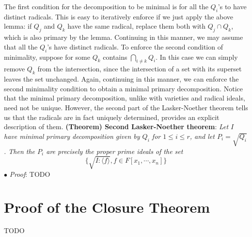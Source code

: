 \documentclass{article}
\newcommand*{\tb}{\textbf}
\newcommand*{\ti}{\textit}
\newcommand*{\nn}{\newline \newline}
\newcommand*{\Pf}{\indent \ensuremath{\bullet} \textit{Proof}: }
\newcommand*{\Fx}{\ensuremath{F[x_1, \cdots, x_n]}}
\begin{document}
The first condition for the decomposition to be minimal is for all the $ Q_i $'s to have distinct radicals. This is easy to iteratively enforce if we just apply the above lemma: if $ Q_j $ and $ Q_k $ have the same radical, replace them both with $ Q_j \cap Q_k $, which is also primary by the lemma. Continuing in this manner, we may assume that all the $ Q_i $'s have distinct radicals. To enforce the second condition of minimality, suppose for some $ Q_k $ contains $ \bigcap_{i \neq k} Q_i $. In this case we can simply remove $ Q_k $ from the intersection, since the intersection of a set with its superset leaves the set unchanged. Again, continuing in this manner, we can enforce the second minimality condition to obtain a minimal primary decomposition. \qedsymbol
\nn
Notice that the minimal primary decomposition, unlike with varieties and radical ideals, need not be unique. However, the second part of the Lasker-Noether theorem tells us that the radicals are in fact uniquely determined, provides an explicit description of them.
\nn
\tb{(Theorem) Second Lasker-Noether theorem}: \ti{Let $ I $ have minimal primary decomposition given by $ Q_i $ for $ 1 \leq i \leq r $, and let $ P_i = \sqrt{Q_i} $. Then the $ P_i $ are precisely the proper prime ideals of the set}
$$ \{ \sqrt{I : \langle f \rangle}, f \in \Fx \} $$
\Pf TODO

\section{Proof of the Closure Theorem}
TODO
\end{document}
